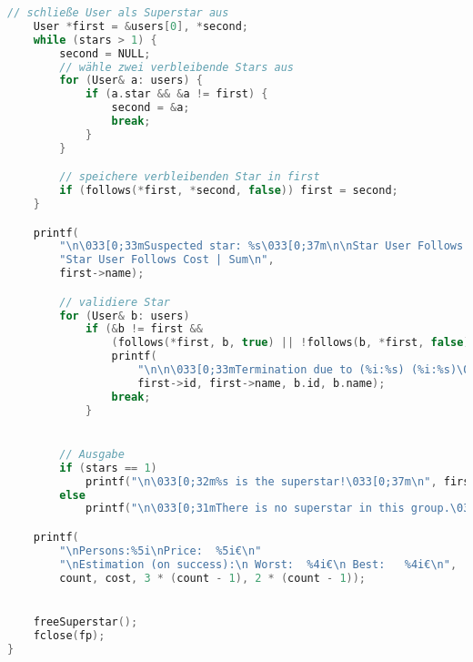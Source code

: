\documentclass[a4paper,10pt,ngerman]{scrartcl}
\begin{document}
\begin{lstlisting}[language=C++]
    // schließe User als Superstar aus
    User *first = &users[0], *second;
    while (stars > 1) {
        second = NULL;
        // wähle zwei verbleibende Stars aus
        for (User& a: users) {
            if (a.star && &a != first) {
                second = &a;
                break;
            }
        }

        // speichere verbleibenden Star in first
        if (follows(*first, *second, false)) first = second;
    }

    printf(
        "\n\033[0;33mSuspected star: %s\033[0;37m\n\nStar User Follows Cost | "
        "Star User Follows Cost | Sum\n",
        first->name);

        // validiere Star
        for (User& b: users)
            if (&b != first &&
                (follows(*first, b, true) || !follows(b, *first, false))) {
                printf(
                    "\n\n\033[0;33mTermination due to (%i:%s) (%i:%s)\033[0;31m",
                    first->id, first->name, b.id, b.name);
                break;
            }


        // Ausgabe
        if (stars == 1)
            printf("\n\033[0;32m%s is the superstar!\033[0;37m\n", first->name);
        else
            printf("\n\033[0;31mThere is no superstar in this group.\033[0;37m\n");

    printf(
        "\nPersons:%5i\nPrice:  %5i€\n"
        "\nEstimation (on success):\n Worst:  %4i€\n Best:   %4i€\n",
        count, cost, 3 * (count - 1), 2 * (count - 1));


    freeSuperstar();
    fclose(fp);
}
\end{lstlisting}
\end{document}
